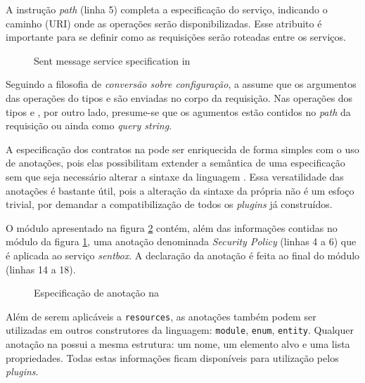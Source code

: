 A instrução \emph{path} (linha 5) completa a especificação do serviço, indicando
o caminho (URI) onde as operações serão disponibilizadas. Esse atribuito é importante para se definir
como as requisições serão roteadas entre os serviços.

\vspace{6mm}

\begin{figure}[htb]
\begin{small}

\end{small}
\caption{Sent message service specification in \neoidl}
\label{lst:sentmessage-neo}
\end{figure}

Seguindo a filosofia de \emph{conversão sobre configuração}, a \neoidl{} assume
que os argumentos das operações do tipos  e  são
enviadas no corpo da requisição. Nas operações dos tipos  e
, por outro lado, presume-se que os agumentos estão contidos no \emph{path} da requisição ou ainda
como \textit{query string}.

A especificação dos contratos na \neoidl{} pode ser enriquecida de forma simples
com o uso de anotações, pois elas possibilitam extender a semântica
de uma especificação sem que seja necessário alterar a sintaxe da
linguagem \neoidl{}. Essa versatilidade das anotações é bastante útil, pois a
alteração da sintaxe da própria \neoidl{} não é um esfoço trivial, por demandar
a compatibilização de todos os \textit{plugins} já construídos.

O módulo apresentado na figura \ref{lst:annotationNeoIDL} contém, além das
informações contidas no módulo da figura \ref{lst:sentmessage-neo}, uma anotação
denominada \emph{Security Policy} (linhas 4 a 6) que é aplicada ao serviço
\emph{sentbox}.
A declaração da anotação é feita ao final do módulo (linhas 14 a 18).

\vspace{6mm}
 
\begin{figure}[htb]
\begin{small}

\vspace{-.5cm}
\end{small}
\caption{Especificação de anotação na \neoidl{}}
\label{lst:annotationNeoIDL}
\end{figure}

Além de serem aplicáveis a \texttt{resources}, as anotações também podem ser
utilizadas em outros construtores da linguagem: \texttt{module},
\texttt{enum}, \texttt{entity}. Qualquer anotação na \neoidl{} possui a mesma estrutura: um
nome, um elemento alvo e uma lista propriedades. Todas estas informações ficam
disponíveis para utilização pelos \textit{plugins}.

